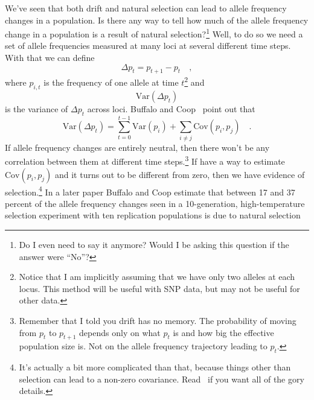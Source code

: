 \documentclass[12pt]{article}
\begin{document}
We've seen that both drift and natural selection can lead to allele
frequency changes in a population. Is there any way to tell how much
of the allele frequency change in a population is a result of natural
selection?\footnote{Do I even need to say it anymore? Would I be
  asking this question if the answer were ``No''?} Well, to do so we
need a set of allele frequencies measured at many loci at several
different time steps. With that we can define
\[
  \Delta p_{t} = p_{t+1} - p_{t} \quad ,
\]
where $p_{i,t}$ is the frequency of one allele at time
$t$\footnote{Notice that I am implicitly assuming that we have only
  two alleles at each locus. This method will be useful with SNP data,
  but may not be useful for other data.} and
\[
  \mbox{Var}(\Delta p_{t})
\]
is the variance of $\Delta p_t$ across loci. Buffalo and
Coop~\cite{Buffalo-Coop-2019} point out that
\[
  \mbox{Var}(\Delta p_{t}) = \sum_{t=0}^{t-1}\mbox{Var}(p_i) +
  \sum_{i \ne j}\mbox{Cov}(p_i,p_j) \quad .
\]
If allele frequency changes are entirely neutral, then there won't be
any correlation between them at different time
steps.\footnote{Remember that I told you drift has no memory. The
  probability of moving from $p_t$ to $p_{t+1}$ depends only on what
  $p_t$ is and how big the effective population size is. Not on the
  allele frequency trajectory leading to $p_t$.} If have a way to
estimate $\mbox{Cov}(p_i, p_j)$ and it turns out to be different from
zero, then we have evidence of selection.\footnote{It's actually a bit
  more complicated than that, because things other than selection can
  lead to a non-zero covariance. Read~\cite{Buffalo-Coop-2019} if you
  want all of the gory details.} In a later paper Buffalo and Coop
estimate that between 17 and 37 percent of the allele frequency
changes seen in a 10-generation, high-temperature selection experiment
with ten replication populations is due to natural selection~\cite{Buffalo-Coop-2020}




\ccLicense
\end{document}

